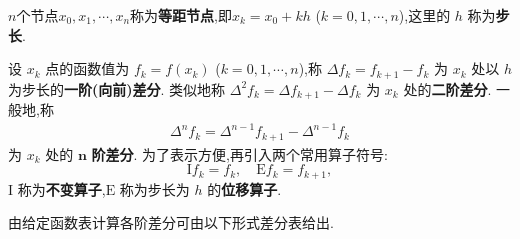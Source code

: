 \documentclass[../../main.tex]{subfiles}%
\begin{document}
\begin{definition}\label{definition:差分定义}
$n$个节点$x_0,x_1,\cdots,x_n$称为\textbf{等距节点},即$x_k = x_0 + kh$ ($k = 0, 1, \cdots, n$),这里的 $h$ 称为\textbf{步长}.

设 $x_k$ 点的函数值为 $f_k = f(x_k)$ ($k = 0, 1, \cdots, n$),称 $\Delta f_k = f_{k+1} - f_k$ 为 $x_k$ 处以 $h$ 为步长的\textbf{一阶(向前)差分}. 类似地称 $\Delta^2 f_k = \Delta f_{k+1} - \Delta f_k$ 为 $x_k$ 处的\textbf{二阶差分}. 一般地,称
\begin{align}
\Delta^n f_k = \Delta^{n-1} f_{k+1} - \Delta^{n-1} f_k \label{eq:数值分析-3.8}
\end{align}
为 $x_k$ 处的 $\boldsymbol{n}$ \textbf{阶差分}. 为了表示方便,再引入两个常用算子符号:
\[
\mathrm{I}f_k = f_k, \quad \mathrm{E}f_k = f_{k+1},
\]
$\mathrm{I}$ 称为\textbf{不变算子},$\mathrm{E}$ 称为步长为 $h$ 的\textbf{位移算子}.
\end{definition}

由给定函数表计算各阶差分可由以下形式差分表给出.
\begin{table}[H]
\scriptsize
\centering
\caption{}
\label{table:差分表}
\end{table}
\end{document}
